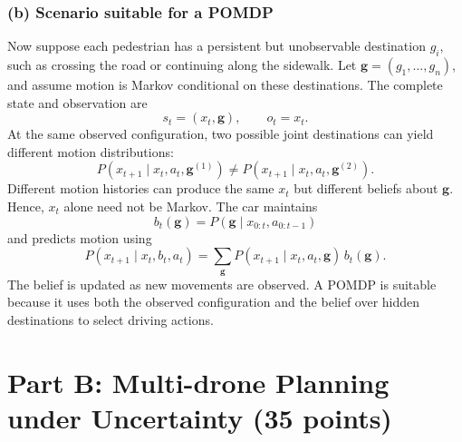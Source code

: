 \documentclass[11pt,a4paper]{article}
\begin{document}
\subsubsection*{(b) Scenario suitable for a POMDP}

Now suppose each pedestrian has a persistent but unobservable destination
$g_i$, such as crossing the road or continuing along the sidewalk.
Let $\mathbf g=(g_1,\ldots,g_n)$, and assume motion is Markov conditional
on these destinations. The complete state and observation are
\[
s_t=(x_t,\mathbf g),\qquad o_t=x_t.
\]
At the same observed configuration, two possible joint destinations
can yield different motion distributions:
\[
P(x_{t+1}\mid x_t,a_t,\mathbf g^{(1)})
\neq
P(x_{t+1}\mid x_t,a_t,\mathbf g^{(2)}).
\]
Different motion histories can produce the same $x_t$ but different
beliefs about $\mathbf g$. Hence, $x_t$ alone need not be Markov.
The car maintains
\[
b_t(\mathbf g)=P(\mathbf g\mid x_{0:t},a_{0:t-1})
\]
and predicts motion using
\[
P(x_{t+1}\mid x_t,b_t,a_t)
=\sum_{\mathbf g}
P(x_{t+1}\mid x_t,a_t,\mathbf g)\,b_t(\mathbf g).
\]
The belief is updated as new movements are observed. A POMDP is suitable
because it uses both the observed configuration and the belief over hidden
destinations to select driving actions.
\par
\endgroup

\clearpage
\section*{Part B: Multi-drone Planning under Uncertainty (35 points)}
\end{document}
